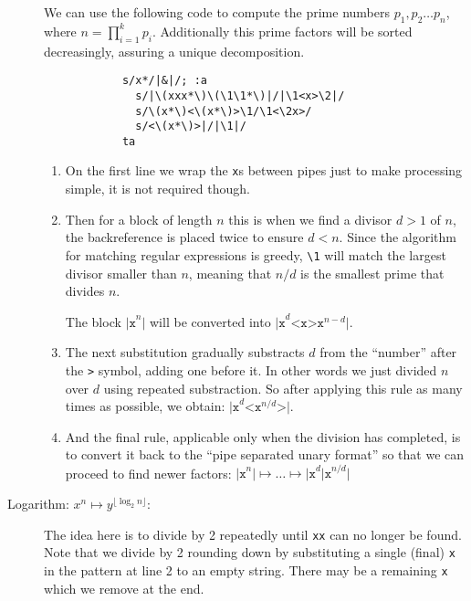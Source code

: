 \begin{description}
		We can use the following code to compute the prime numbers
		$p_1, p_2\ldots p_n$, where $n=\prod_{i=1}^k p_i$.
		Additionally this prime factors will be sorted
		decreasingly, assuring a unique decomposition.

		\begin{Verbatim}
			s/x*/|&|/; :a
			  s/|\(xxx*\)\(\1\1*\)|/|\1<x>\2|/
			  s/\(x*\)<\(x*\)>\1/\1<\2x>/
			  s/<\(x*\)>|/|\1|/
			ta
		\end{Verbatim}

		\begin{enumerate}
			\item On the first line we wrap the {\tt x}s between pipes just to
				make processing simple, it is not required though.

			\item Then for a block of length $n$ this is when we find a 
				divisor $d>1$ of $n$, the backreference is placed twice to ensure
				$d<n$.  Since the algorithm for matching regular expressions is
				greedy, \verb|\1| will match the largest divisor smaller than $n$,
				meaning that $n/d$ is the smallest prime that divides $n$.

				The block $\texttt{|x}^n\texttt{|}$ will be converted into
				$\texttt{|x}^d\texttt{<x>x}^{n-d}\texttt{|}$.

			\item The next substitution gradually substracts $d$ from the
				``number'' after the \verb|>| symbol, adding one before it.
				In other words we just divided $n$ over $d$ using repeated
				substraction.
				So after applying this rule as many times as possible, we obtain:
				$\texttt{|x}^d\texttt{<x}^{n/d}\texttt{>|}$.

			\item And the final rule, applicable only when the division has
				completed, is to convert it back to the ``pipe separated
				unary format'' so that we can proceed to find newer factors:
				$ \texttt{|x}^n\texttt{|} \mapsto \ldots
				\mapsto \texttt{|x}^d\texttt{|x}^{n/d}\texttt{|}$
		\end{enumerate}

	\item[Logarithm: $x^n\mapsto y^{\lfloor\log_2 n\rfloor}$:]

		The idea here is to divide by 2 repeatedly until {\tt xx} can no longer
		be found.  Note that we divide by 2 rounding down by substituting a
		single (final) {\tt x} in the pattern at line 2 to an empty string.
		There may be a remaining {\tt x} which we remove at the end.


\end{description}
